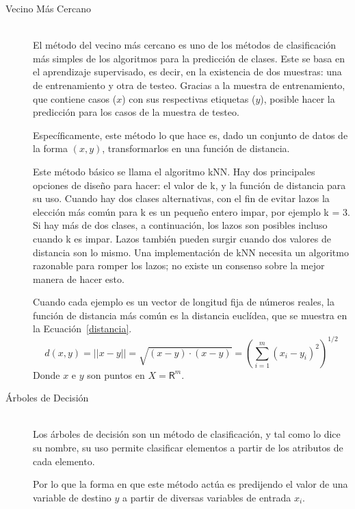 \begin{enumerate}
\begin{description}
      \item[Vecino Más Cercano] \hfill \\
     El método del vecino más cercano es uno de los métodos de clasificación más simples de los algoritmos para la predicción de clases. Este se basa en el aprendizaje supervisado, es decir, en la existencia de dos muestras: una de entrenamiento y otra de testeo. Gracias a la muestra de entrenamiento, que contiene casos ($x$) con sus respectivas etiquetas ($y$), posible hacer la predicción para los casos de la muestra de testeo.
     
     Específicamente, este método lo que hace es, dado un conjunto de datos de la forma $(x,y)$, transformarlos en una función de distancia. 
     
     Este método básico se llama el algoritmo kNN. Hay dos principales opciones de diseño para hacer: el valor de k, y la función de distancia para su uso. Cuando hay dos clases alternativas, con el fin de evitar lazos la elección más común para k es un pequeño entero impar, por ejemplo k = 3. Si hay más de dos clases, a continuación, los lazos son posibles incluso cuando k es impar. Lazos también pueden surgir cuando dos valores de distancia son lo mismo. Una implementación de kNN necesita un algoritmo razonable para romper los lazos; no existe un consenso sobre la mejor manera de hacer esto.
     
     Cuando cada ejemplo es un vector de longitud fija de números reales, la función de distancia más común es la distancia euclídea, que se muestra en la Ecuación~\ref{distancia}.
     \begin{equation}\label{distancia}
     d(x,y)=||x-y||=\sqrt{(x-y) \cdot (x-y)}=(\sum_{i=1}^m (x_i - y_i )^2)^{1/2}
     \end{equation}
      Donde $x$ e $y$ son puntos en $X=\mathsf{R}^m$.
      
      \item[Árboles de Decisión] \hfill \\
      Los árboles de decisión son un método de clasificación, y tal como lo dice su nombre, su uso permite clasificar elementos a partir de los atributos de cada elemento. 
      
      Por lo que la forma en que este método actúa es predijendo el valor de una variable de destino $y$ a partir de diversas variables de entrada $x_i$.
      

\end{description}
\end{enumerate}
